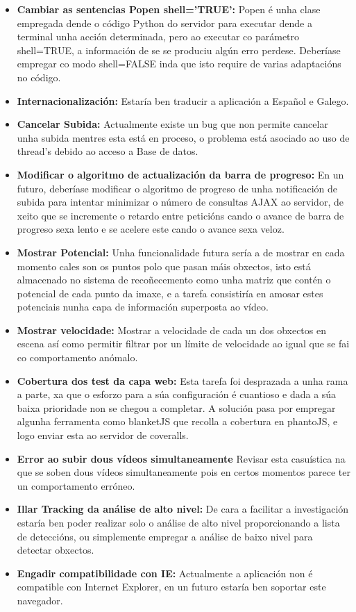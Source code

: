     \begin{itemize}
     \item \textbf{Cambiar as sentencias Popen shell='TRUE':}     
        Popen é unha clase empregada dende o código Python do servidor para executar dende a 
        terminal unha acción determinada, pero ao executar co parámetro shell=TRUE, a información
        de se se produciu algún erro perdese. Deberíase empregar co modo shell=FALSE inda que isto
        require de varias adaptacións no código.
     \item \textbf{Internacionalización:}
        Estaría ben traducir a aplicación a Español e Galego.
     \item \textbf{Cancelar Subida:}
        Actualmente existe un bug que non permite cancelar unha subida mentres esta está en proceso,
        o problema está asociado ao uso de thread's debido ao acceso a Base de datos.
     \item \textbf{Modificar o algoritmo de actualización da barra de progreso:}
        En un futuro, deberíase modificar o algoritmo de progreso de unha notificación de subida para intentar
        minimizar o número de consultas AJAX ao servidor, de xeito que se incremente o retardo entre peticións
        cando o avance de barra de progreso sexa lento e se acelere este cando o avance sexa veloz.
    \item \textbf{Mostrar Potencial:}
        Unha funcionalidade futura sería a de mostrar en cada momento cales son os puntos polo que 
        pasan máis obxectos, isto está almacenado no sistema de recoñecemento como unha matriz que 
        contén o potencial de cada punto da imaxe, e a tarefa consistiría en amosar estes potenciais
        nunha capa de información superposta ao vídeo.
    \item \textbf{Mostrar velocidade:}
        Mostrar a velocidade de cada un dos obxectos en escena así como permitir filtrar por un 
        límite de velocidade ao igual que se fai co comportamento anómalo.
    \item \textbf{Cobertura dos test da capa web:}
        Esta tarefa foi desprazada a unha rama a parte, xa que o esforzo para a súa configuración é
        cuantioso e dada a súa baixa prioridade non se chegou a completar. A solución pasa por 
        empregar algunha ferramenta como blanketJS que recolla a cobertura en phantoJS, e logo 
        enviar esta ao servidor de coveralls. 
    \item \textbf{Error ao subir dous vídeos simultaneamente}
        Revisar esta casuística na que se soben dous vídeos simultaneamente pois en certos momentos
        parece ter un comportamento erróneo.
    \item \textbf{Illar Tracking da análise de alto nivel:}
        De cara a facilitar a investigación estaría ben poder realizar solo o análise de alto nivel 
        proporcionando a lista de deteccións, ou simplemente empregar a análise de baixo nivel 
        para detectar obxectos.
    \item \textbf{Engadir compatibilidade con IE:}
        Actualmente a aplicación non é compatible con Internet Explorer, en un futuro estaría ben 
        soportar este navegador.
    \end{itemize}

